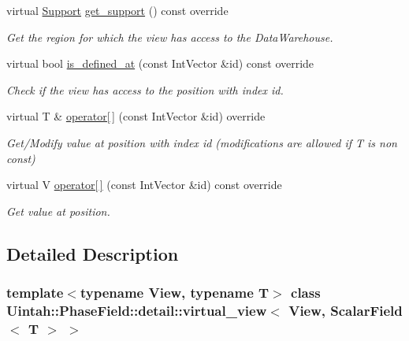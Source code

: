 \begin{DoxyCompactItemize}
virtual \hyperlink{classUintah_1_1PhaseField_1_1Support}{Support} \hyperlink{classUintah_1_1PhaseField_1_1detail_1_1virtual__view_3_01View_00_01ScalarField_3_01T_01_4_01_4_ab9bb57a49901fc4a43e237b57abc6a68}{get\+\_\+support} () const override
\begin{DoxyCompactList}\small\item\em Get the region for which the view has access to the Data\+Warehouse. \end{DoxyCompactList}\item 
virtual bool \hyperlink{classUintah_1_1PhaseField_1_1detail_1_1virtual__view_3_01View_00_01ScalarField_3_01T_01_4_01_4_a11e75c88613b87a5344c5e8a2f6b5846}{is\+\_\+defined\+\_\+at} (const Int\+Vector \&id) const override
\begin{DoxyCompactList}\small\item\em Check if the view has access to the position with index id. \end{DoxyCompactList}\item 
virtual T \& \hyperlink{classUintah_1_1PhaseField_1_1detail_1_1virtual__view_3_01View_00_01ScalarField_3_01T_01_4_01_4_a443527d662efea83fb709b0df277f0f2}{operator\mbox{[}$\,$\mbox{]}} (const Int\+Vector \&id) override
\begin{DoxyCompactList}\small\item\em Get/\+Modify value at position with index id (modifications are allowed if T is non const) \end{DoxyCompactList}\item 
virtual V \hyperlink{classUintah_1_1PhaseField_1_1detail_1_1virtual__view_3_01View_00_01ScalarField_3_01T_01_4_01_4_a1c8d0aeb10d5b0b3f04b44e41d61130b}{operator\mbox{[}$\,$\mbox{]}} (const Int\+Vector \&id) const override
\begin{DoxyCompactList}\small\item\em Get value at position. \end{DoxyCompactList}\end{DoxyCompactItemize}


\subsection{Detailed Description}
\subsubsection*{template$<$typename View, typename T$>$\newline
class Uintah\+::\+Phase\+Field\+::detail\+::virtual\+\_\+view$<$ View, Scalar\+Field$<$ T $>$ $>$}

